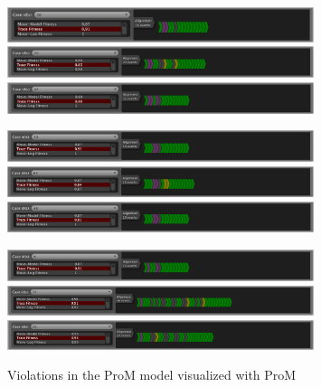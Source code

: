 \begin{figure}[H]
\centering
\includegraphics[width=0.8\textwidth]{figures/violation_case/10-prom.png}
\includegraphics[width=0.8\textwidth]{figures/violation_case/20-prom.png}
\includegraphics[width=0.8\textwidth]{figures/violation_case/47-prom.png}

\includegraphics[width=0.8\textwidth]{figures/violation_case/53-prom.png}
\includegraphics[width=0.8\textwidth]{figures/violation_case/63-prom.png}
\includegraphics[width=0.8\textwidth]{figures/violation_case/88-prom.png}

\includegraphics[width=0.8\textwidth]{figures/violation_case/6-prom.png}
\includegraphics[width=0.8\textwidth]{figures/violation_case/72-prom.png}
\includegraphics[width=0.8\textwidth]{figures/violation_case/81-prom.png}
\caption{Violations in the ProM model visualized with ProM}
\label{fig:violations_prom}
\end{figure}

